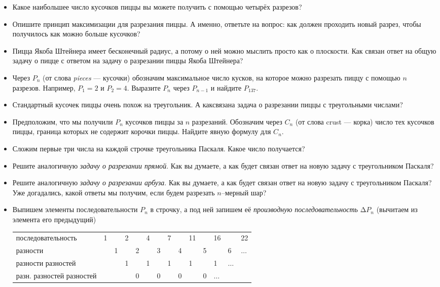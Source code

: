 \begin{itemize}
\item Какое наибольшее число кусочков пиццы вы можете получить с помощью четырёх разрезов?
\item Опишите принцип максимизации для разрезания пиццы. А именно, ответьте на вопрос: как должен проходить новый разрез, чтобы получилось как можно больше кусочков?
\item Пицца Якоба Штейнера имеет бесконечный радиус, а потому о ней можно мыслить просто как о плоскости. Как связан ответ на общую задачу о пицце с ответом на задачу о разрезании пиццы Якоба Штейнера?
\item Через $P_n$ (от слова {\itshape pieces} --- кусочки) обозначим максимальное число кусков, на которое можно разрезать пиццу с помощью $n$ разрезов. Например, $P_1 = 2$ и $P_2 = 4$. Выразите $P_n$ через $P_{n-1}$ и найдите $P_{137}$.
\item Стандартный кусочек пиццы очень похож на треугольник. А как\linebreak связана задача о разрезании пиццы с треугольными числами?
\item Предположим, что мы получили $P_n$ кусочков пиццы за $n$ разрезаний. Обозначим через $C_n$ (от слова crust --- корка) число тех кусочков пиццы, граница которых не содержит корочки пиццы. Найдите явную формулу для $C_n$.
\item Сложим первые три числа на каждой строчке треугольника Паскаля. Какое число получается?
\item Решите аналогичную {\itshape задачу о разрезании прямой}. Как вы думаете, а как будет связан ответ на новую задачу с треугольником Паскаля?
\item Решите аналогичную {\itshape задачу о разрезании арбуза}. Как вы думаете, а как будет связан ответ на новую задачу с треугольником Паскаля? Уже догадались, какой ответы мы получим, если будем разрезать $n$--мерный шар?

\item Выпишем элементы последовательности $P_n$ в строчку, а под ней запишем её {\itshape производную последовательность} $\text{Δ} P_n$ (вычитаем из элемента его предыдущий)

\begin{center} \scriptsize \begin{tabular}{llllllllllllll}
	\hline
	{\tiny последовательность} & 1 & & 2 & & 4 & & 7 & & 11 & & 16 & & 22\\
	{\tiny разности} & & 1 & & 2 & & 3 & & 4 & & 5 & & 6 & $\ldots$ \\
	{\tiny разности разностей} & & & 1 & & 1 & & 1 & & 1 & & 1 & $\ldots$ \\
	{\tiny разн. разностей разностей} & & & & 0 & & 0 & & 0 & & 0 & $\ldots$ \\
	\hline
\end{tabular} \end{center} \medskip


\end{itemize}
